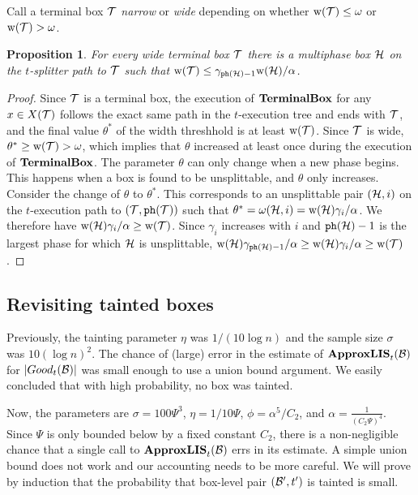 \documentclass{acmsmall}
\newtheorem{prop}[theorem]{Proposition}
\newcommand{\cB}{{\cal B}}
\newcommand{\cH}{{\cal H}}
\newcommand{\cT}{{\cal T}}
\newcommand{\phase}{{\tt ph}}
\newcommand{\terminalbox}{{\rm{\bf TerminalBox}}}
\newcommand{\gridprecval}{\frac{1}{(C_2\errorcont)^4}}
\newcommand{\sszval}{100\errorcont^3}
\newcommand{\taint}{\eta}
\newcommand{\taintval}{1/10\errorcont}
\newcommand{\taintprob}{\phi}
\newcommand{\width}{{\bf {\rm  w}}}
\newcommand{\gridprec}{\alpha}
\newcommand{\errorcont}{\Psi}
\newcommand{\ssz}{\sigma}
\newcommand{\approxlis}{{\rm {\bf ApproxLIS}}}
\begin{document}
Call a terminal box $\cT$ {\em narrow} or {\em wide} depending on whether $\width(\cT) \leq \omega$
or $\width(\cT)>\omega$.  

\begin{prop}
\label{prop:wide}
For every wide terminal box $\cT$ there is a multiphase box $\cH$ on the $t$-splitter path to $\cT$ such that
$\width(\cT) \leq \gamma_{\phase(\cH)-1} \width(\cH)/\gridprec$.
\end{prop}

\begin{proof}
Since $\cT$ is a terminal box, the execution of $\terminalbox$ for any $x \in X(\cT)$ follows the exact same
path in the $t$-execution tree and ends with $\cT$, and the final value
$\theta^*$ of the width threshhold is at least $\width(\cT)$.    
Since $\cT$ is wide, $\theta^* \geq \width(\cT)> \omega$, which implies that 
$\theta$ increased at least once during the execution of $\terminalbox$.   The parameter $\theta$ can only change
when a new phase begins. This happens when a box is found to be unsplittable, and $\theta$ only increases.   
Consider the  change of $\theta$ to $\theta^*$.   This corresponds to 
an  unsplittable pair $(\cH,i)$ on the $t$-execution path to $(\cT,\phase(\cT))$
such that $\theta^*=\omega(\cH,i)=\width(\cH) \gamma_i/\gridprec$.  We therefore have 
$\width(\cH) \gamma_i/\gridprec \geq \width(\cT)$.  Since $\gamma_i$ increases with $i$
and $\phase(\cH)-1$ is the largest phase for which $\cH$ is unsplittable, $\width(\cH) \gamma_{\phase(\cH)-1}/\gridprec \geq \width(\cH) \gamma_i/\gridprec \geq \width(\cT)$.
\end{proof}
    
    
\subsection{Revisiting tainted boxes} \label{sec:tainted}

Previously, the tainting parameter $\taint$ was $1/(10\log n)$ and the sample size $\ssz$ was $10(\log n)^2$.
The chance of (large) error in the estimate of $\approxlis_t(\cB)$ for $|Good_t(\cB)|$ was small
enough to use a union bound argument. We easily concluded that with high probability, no box was tainted.
%

Now, the parameters are $\ssz = \sszval$, $\taint = \taintval$, $\taintprob = \gridprec^5/C_2$,
and $\gridprec = \gridprecval$.
Since $\errorcont$ is only bounded below by a fixed constant $C_2$, there is a non-negligible
chance that a single call to $\approxlis_t(\cB)$ errs in its estimate.
A simple union bound does not work and our accounting needs to be more careful.  
We will prove by induction that the probability that box-level pair $(\cB',t')$ is tainted is small.
\end{document}
